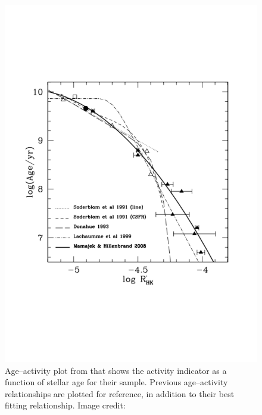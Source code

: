 \begin{figure}
    \centering
    \includegraphics[scale=0.45]{Figures/2-Historical_overview/MH08_age_activity.pdf}
    \caption[Age--activity plot from \citet{Mamajek_Hillenbrand_2008} using chromospheric emission]{Age--activity plot from \citet{Mamajek_Hillenbrand_2008} that shows the \Rprime activity indicator as a function of stellar age for their sample. Previous age--activity relationships are plotted for reference, in addition to their best fitting relationship. Image credit: \citet{Mamajek_Hillenbrand_2008}}
    \label{fig:MH08_age_activity_plot}
\end{figure}

